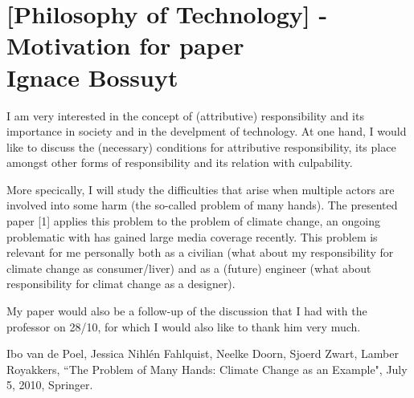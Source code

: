 \documentclass[../main/main.tex]{subfiles}
\begin{document}
\section{[Philosophy of Technology] - Motivation for paper \\ Ignace Bossuyt}

I am very interested in the concept of (attributive) responsibility and its importance in society and in the develpment of technology. At one hand, I would like to discuss the (necessary) conditions for attributive responsibility, its place amongst other forms of responsibility and its relation with culpability.

More specically, I will study the difficulties that arise when multiple actors are involved into some harm (the so-called problem of many hands). The presented paper [1] applies this problem to the problem of climate change, an ongoing problematic with has gained large media coverage recently. This problem is relevant for me personally both as a civilian (what about my responsibility for climate change as consumer/liver) and as a (future) engineer (what about responsibility for climat change as a designer).

My paper would also be a follow-up of the discussion that I had with the professor on 28/10, for which I would also like to thank him very much.

\begin{thebibliography}{12}  
 Ibo van de Poel, Jessica Nihlén Fahlquist, Neelke Doorn, Sjoerd Zwart, Lamber Royakkers, ``The Problem of Many Hands: Climate Change as an Example", July 5, 2010, Springer.

\end{thebibliography}
\end{document}
